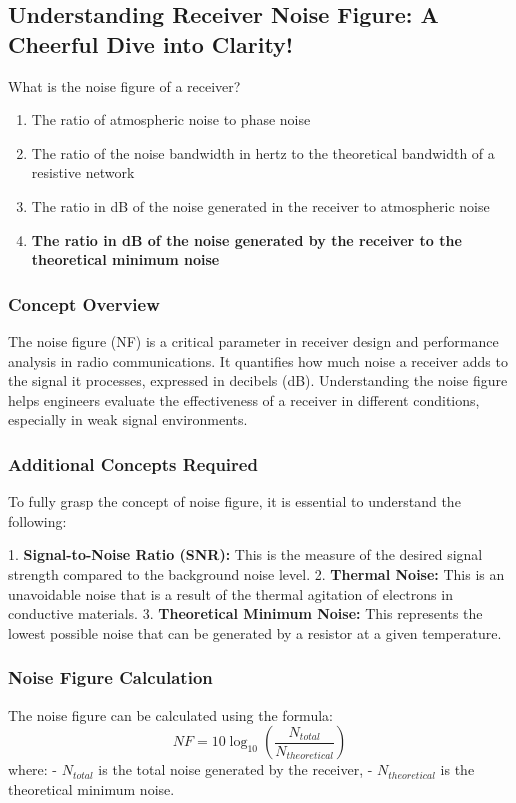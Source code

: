 \subsection{Understanding Receiver Noise Figure: A Cheerful Dive into Clarity!}
\begin{tcolorbox}[colback=gray!10, colframe=black, title=E4C04]
What is the noise figure of a receiver?  
\begin{enumerate}[label=\Alph*.]
    \item The ratio of atmospheric noise to phase noise
    \item The ratio of the noise bandwidth in hertz to the theoretical bandwidth of a resistive network
    \item The ratio in dB of the noise generated in the receiver to atmospheric noise
    \item \textbf{The ratio in dB of the noise generated by the receiver to the theoretical minimum noise}
\end{enumerate} \end{tcolorbox}

\subsubsection{Concept Overview}
The noise figure (NF) is a critical parameter in receiver design and performance analysis in radio communications. It quantifies how much noise a receiver adds to the signal it processes, expressed in decibels (dB). Understanding the noise figure helps engineers evaluate the effectiveness of a receiver in different conditions, especially in weak signal environments.

\subsubsection{Additional Concepts Required}
To fully grasp the concept of noise figure, it is essential to understand the following:

1. \textbf{Signal-to-Noise Ratio (SNR):} This is the measure of the desired signal strength compared to the background noise level.
2. \textbf{Thermal Noise:} This is an unavoidable noise that is a result of the thermal agitation of electrons in conductive materials.
3. \textbf{Theoretical Minimum Noise:} This represents the lowest possible noise that can be generated by a resistor at a given temperature.

\subsubsection{Noise Figure Calculation}
The noise figure can be calculated using the formula:
\[
NF = 10 \log_{10} \left( \frac{N_{total}}{N_{theoretical}} \right)
\]
where:
- \(N_{total}\) is the total noise generated by the receiver,
- \(N_{theoretical}\) is the theoretical minimum noise.

